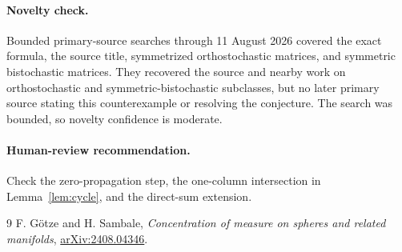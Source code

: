 \documentclass[11pt]{article}
\begin{document}
\paragraph{Novelty check.}
Bounded primary-source searches through 11 August 2026 covered the exact
formula, the source title, symmetrized orthostochastic matrices, and
symmetric bistochastic matrices. They recovered the source and nearby work
on orthostochastic and symmetric-bistochastic subclasses, but no later
primary source stating this counterexample or resolving the conjecture. The
search was bounded, so novelty confidence is moderate.

\paragraph{Human-review recommendation.}
Check the zero-propagation step, the one-column intersection in
Lemma~\ref{lem:cycle}, and the direct-sum extension.

\begin{thebibliography}{9}
F. G\"otze and H. Sambale,
\emph{Concentration of measure on spheres and related manifolds},
\href{https://arxiv.org/abs/2408.04346}{arXiv:2408.04346}.
\end{thebibliography}
\end{document}
